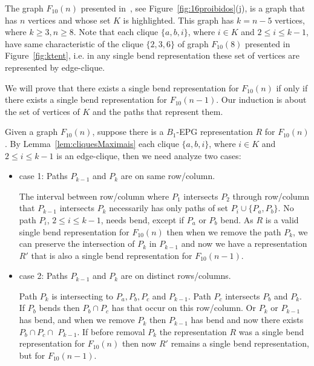 \documentclass[9pt]{entcs}
\begin{document}
\begin{pf}
The graph $F_{10}(n)$ presented in~\cite{alcon2015characterizing}, see Figure~\ref{fig:16proibidos}(j), is a graph that has $n$ vertices and whose set $K$ is highlighted. This graph has $k=n-5$ vertices, where $k\geq 3, n\geq 8$. Note that each clique $\{a, b, i\}$, where $i \in K$ and  $2\leq i \leq k-1$, have same  characteristic of the clique $\{2, 3, 6\}$  of graph $F_{10}(8)$ presented in Figure~\ref{fig:ktent}, i.e. in any single bend representation these set of vertices are represented by edge-clique.

We will prove that there exists a single bend representation for $F_{10}(n)$ if only if there exists a single bend representation for $F_{10}(n-1)$. Our induction  is about the set of vertices of $K$ and the paths that represent them.

%

Given a graph $F_{10}(n)$, suppose there is a $B_1$-EPG representation $R$ for $F_{10}(n)$. By Lemma~\ref{lem:cliquesMaximais} each clique $\{a, b, i\}$, where $i \in K$ and  $2\leq i \leq k-1$ is an edge-clique, then we need analyze two cases:

\begin{itemize}
    \item case 1: Paths $\displaystyle P_{{k-1}}$ and $\displaystyle P_{{k}}$ are on same row/column.
    
    The interval between row/column where $ P_{{1}}$ intersects $ P_{{2}}$ through row/column that $ P_{{k-1}}$ intersects $ P_{{k}}$  necessarily has only paths of set $P_i \cup \{P_a,P_b\}$. No path $P_i$, $2 \leq i \leq k-1$, needs bend, except if $P_a$ or $P_b$ bend.
     As $R$ is a valid single bend representation for $F_{10}(n)$ then when we remove the path $\displaystyle P_{{k}}$, we can preserve the intersection of $P_{{k}}$ in $P_{{k-1}}$ and now we have a representation $R'$ that is also a  single bend representation for $F_{10}(n-1)$.
    
      \item case 2: Paths $\displaystyle P_{{k-1}}$ and $\displaystyle P_{{k}}$ are on distinct rows/columns.
      
      Path $\displaystyle P_{{k}}$ is intersecting to $P_a, P_b, P_c$ and $\displaystyle P_{{k-1}}$. Path $P_c$ intersects $P_b$ and $\displaystyle P_{{k}}$. If $\displaystyle P_{b}$ bends then $P_b \cap P_c$ has that occur on this row/column. Or $\displaystyle P_{{k}}$ or $\displaystyle P_{{k-1}}$ has bend, and when we remove $\displaystyle P_{{k}}$ then $\displaystyle P_{{k-1}}$ has bend and now there exists $P_b \cap  P_c \cap $ $\displaystyle P_{{k-1}}$. If before removal $\displaystyle P_{{k}}$ the representation $R$ was a single bend representation for $F_{10}(n)$ then now $R'$ remains a single bend representation, but for $F_{10}(n-1)$.    
\end{itemize}


\end{pf}
\end{document}
